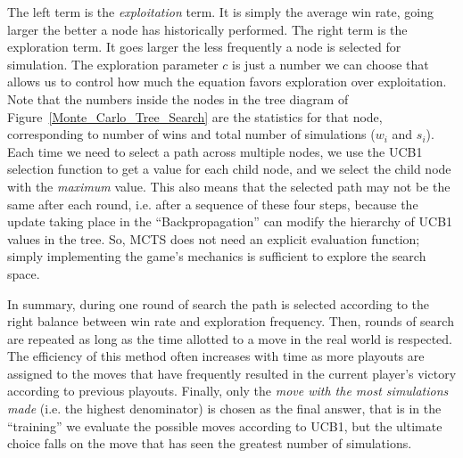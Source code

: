 The left term is the \emph{exploitation} term. It is simply the average win rate, going larger the better a node has historically performed. The right term is the exploration term. It goes larger the less frequently a node is selected for simulation. The exploration parameter $c$ is just a number we can choose that allows us to control how much the equation favors exploration over exploitation. Note that the numbers inside the nodes in the tree diagram of Figure~\ref{Monte_Carlo_Tree_Search} are the statistics for that node, corresponding to number of wins and total number of simulations ($w_i$ and $s_i$). Each time we need to select a path across multiple nodes, we use the UCB1 selection function to get a value for each child node, and we select the child node with the \emph{maximum} value. This also means that the selected path may not be the same after each round, i.e. after a sequence of these four steps, because the update taking place in the ``Backpropagation'' can modify the hierarchy of UCB1 values in the tree. So, MCTS does not need an explicit evaluation function; simply implementing the game's mechanics is sufficient to explore the search space.

In summary, during one round of search the path is selected according to the right balance between win rate and exploration frequency. Then, rounds of search are repeated as long as the time allotted to a move in the real world is respected. The efficiency of this method often increases with time as more playouts are assigned to the moves that have frequently resulted in the current player's victory according to previous playouts. Finally, only the \emph{move with the most simulations made} (i.e. the highest denominator) is chosen as the final answer, that is in the ``training'' we evaluate the possible moves according to UCB1, but the ultimate choice falls on the move that has seen the greatest number of simulations.
























